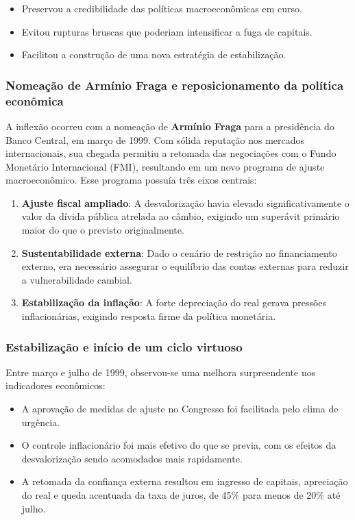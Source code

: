 \documentclass[a4paper,12pt]{article}[abntex2]
\begin{document}
\begin{itemize}
    \item Preservou a credibilidade das políticas macroeconômicas em curso.
    \item Evitou rupturas bruscas que poderiam intensificar a fuga de capitais.
    \item Facilitou a construção de uma nova estratégia de estabilização.
\end{itemize}

\subsubsection{\textbf{Nomeação de Armínio Fraga e reposicionamento da política econômica}}

A inflexão ocorreu com a nomeação de \textbf{Armínio Fraga} para a presidência do Banco Central, em março de 1999. Com sólida reputação nos mercados internacionais, sua chegada permitiu a retomada das negociações com o Fundo Monetário Internacional (FMI), resultando em um novo programa de ajuste macroeconômico. Esse programa possuía três eixos centrais:

\begin{enumerate}
    \item \textbf{Ajuste fiscal ampliado}: A desvalorização havia elevado significativamente o valor da dívida pública atrelada ao câmbio, exigindo um superávit primário maior do que o previsto originalmente.
    \item \textbf{Sustentabilidade externa}: Dado o cenário de restrição no financiamento externo, era necessário assegurar o equilíbrio das contas externas para reduzir a vulnerabilidade cambial.
    \item \textbf{Estabilização da inflação}: A forte depreciação do real gerava pressões inflacionárias, exigindo resposta firme da política monetária.
\end{enumerate}

\subsubsection{\textbf{Estabilização e início de um ciclo virtuoso}}

Entre março e julho de 1999, observou-se uma melhora surpreendente nos indicadores econômicos:

\begin{itemize}
    \item A aprovação de medidas de ajuste no Congresso foi facilitada pelo clima de urgência.
    \item O controle inflacionário foi mais efetivo do que se previa, com os efeitos da desvalorização sendo acomodados mais rapidamente.
    \item A retomada da confiança externa resultou em ingresso de capitais, apreciação do real e queda acentuada da taxa de juros, de 45\% para menos de 20\% até julho.
\end{itemize}
\end{document}
